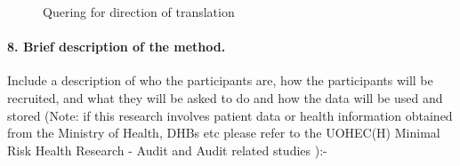 \begin{figure}%
	\centering
	\qquad	
	\qquad
	\caption{Quering for direction of translation}%
	\label{fig:query_direction}%
\end{figure}



\paragraph{8.	Brief description of the method.} Include a description of who the participants are, how the participants will be recruited, and what they will be asked to do and how the data will be used and stored (Note: if this research involves patient data or health information obtained from the Ministry of Health, DHBs etc please refer to the UOHEC(H) Minimal Risk Health Research  - Audit and Audit related studies ):-

